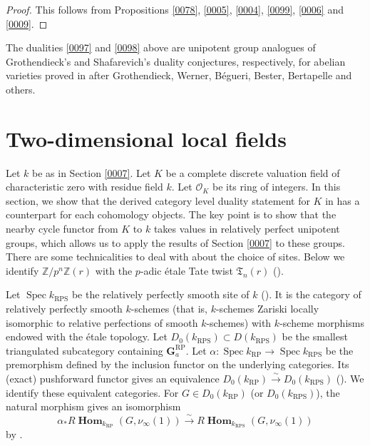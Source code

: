 \documentclass{amsart}
\theoremstyle{remark}
\numberwithin{equation}{section}
\newcommand{\Order}{\mathcal{O}}
\newcommand{\isomto}{\overset{\sim}{\to}}
\newcommand{\Z}{\mathbb{Z}}
\newcommand{\Ga}{\mathbf{G}_{a}}
\newcommand{\alg}[1]{\mathbf{#1}}
\newcommand{\RP}{\mathrm{RP}}
\newcommand{\RPS}{\mathrm{RPS}}
\DeclareMathOperator{\Spec}{Spec}
\DeclareMathOperator{\sheafhom}{\alg{Hom}}
\begin{document}
\begin{proof}
	This follows from Propositions \ref{0078}, \ref{0005}, \ref{0004}, \ref{0099}, \ref{0006} and \ref{0009}.
\end{proof}

The dualities \eqref{0097} and \eqref{0098} above are unipotent group analogues
of Grothendieck's and Shafarevich's duality conjectures, respectively, for abelian varieties
proved in \cite{Suz20} after Grothendieck, Werner, B\'egueri, Bester, Bertapelle and others.



\section{Two-dimensional local fields}
\label{0070}

Let $k$ be as in Section \ref{0007}.
Let $K$ be a complete discrete valuation field of characteristic zero
with residue field $k$.
Let $\Order_{K}$ be its ring of integers.
In this section, we show that
the derived category level duality statement for $K$ in \cite[Section 6]{Suz24}
has a counterpart for each cohomology objects.
The key point is to show that the nearby cycle functor from $K$ to $k$ takes values in
relatively perfect unipotent groups,
which allows us to apply the results of Section \ref{0007} to these groups.
There are some technicalities to deal with
about the choice of sites.
Below we identify $\Z / p^{n} \Z(r)$ with the $p$-adic \'etale Tate twist $\mathfrak{T}_{n}(r)$
(\cite{Sch94, Gei04Ded, Sat07, Sat13}).

Let $\Spec k_{\RPS}$ be the relatively perfectly smooth site of $k$ (\cite[Section 2]{KS19}).
It is the category of relatively perfectly smooth $k$-schemes
(that is, $k$-schemes Zariski locally isomorphic to relative perfections of smooth $k$-schemes)
with $k$-scheme morphisms endowed with the \'etale topology.
Let $D_{0}(k_{\RPS}) \subset D(k_{\RPS})$ be
the smallest triangulated subcategory containing $\Ga^{\RP}$.
Let $\alpha \colon \Spec k_{\RP} \to \Spec k_{\RPS}$ be the premorphism
defined by the inclusion functor on the underlying categories.
Its (exact) pushforward functor gives an equivalence
$D_{0}(k_{\RP}) \isomto D_{0}(k_{\RPS})$ (\cite[Corollary 2.3]{KS19}).
We identify these equivalent categories.
For $G \in D_{0}(k_{\RP})$ (or $D_{0}(k_{\RPS})$), the natural morphism gives an isomorphism
	\[
			\alpha_{\ast}
			R \sheafhom_{k_{\RP}}(G, \nu_{\infty}(1))
		\isomto
			R \sheafhom_{k_{\RPS}}(G, \nu_{\infty}(1))
	\]
by \cite[Proposition 2.2]{KS19}.
\end{document}
